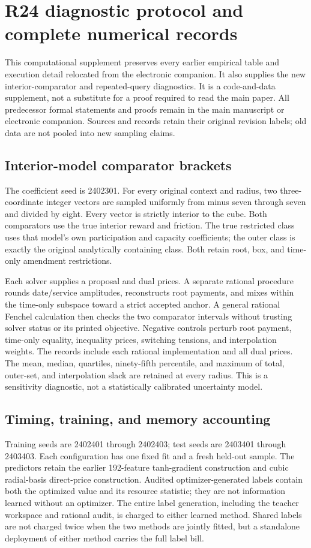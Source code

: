 \section{R24 diagnostic protocol and complete numerical records}\label{cs:r24-details}
This computational supplement preserves every earlier empirical table and
execution detail relocated from the electronic companion. It also supplies the
new interior-comparator and repeated-query diagnostics. It is a code-and-data
supplement, not a substitute for a proof required to read the main paper.
All predecessor formal statements and proofs remain in the main manuscript or
electronic companion. Sources and records retain their original revision labels;
old data are not pooled into new sampling claims.

\subsection{Interior-model comparator brackets}
The coefficient seed is 2402301. For every original context and radius, two
three-coordinate integer vectors are sampled uniformly from minus seven through
seven and divided by eight. Every vector is strictly interior to the cube.
Both comparators use the true interior reward and friction. The true restricted
class uses that model's own participation and capacity coefficients; the outer
class is exactly the original analytically containing class. Both retain root,
box, and time-only amendment restrictions.

Each solver supplies a proposal and dual prices. A separate rational procedure
rounds date/service amplitudes, reconstructs root payments, and mixes within the
time-only subspace toward a strict accepted anchor. A general rational Fenchel
calculation then checks the two comparator intervals without trusting solver
status or its printed objective. Negative controls perturb root payment,
time-only equality, inequality prices, switching tensions, and interpolation
weights. The records include each rational implementation and all dual prices.
The mean, median, quartiles, ninety-fifth percentile, and maximum of total,
outer-set, and interpolation slack are retained at every radius. This is a
sensitivity diagnostic, not a statistically calibrated uncertainty model.

\subsection{Timing, training, and memory accounting}
Training seeds are 2402401 through 2402403; test seeds are 2403401 through
2403403. Each configuration has one fixed fit and a fresh held-out sample.
The predictors retain the earlier 192-feature tanh-gradient construction and
cubic radial-basis direct-price construction. Audited optimizer-generated labels contain
both the optimized value and its resource statistic; they are not information
learned without an optimizer. The entire label generation, including the
teacher workspace and rational audit, is charged to either learned method.
Shared labels are not charged twice when the two methods are jointly fitted,
but a standalone deployment of either method carries the full label bill.

